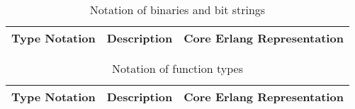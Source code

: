 \begin{table}[t]
  \centering
  \begin{tabularx}{\textwidth}{|c|>{\centering\arraybackslash}X|>{\centering\arraybackslash}X|}
    \hline
      Type Notation & Description & Core Erlang Representation \\
    \hline \hline
    \hline
  \end{tabularx}
  \caption{Notation of binaries and bit strings}
  \label{tab:notation_binary_types}
\end{table}

\begin{table}[t]
  \centering
  \begin{tabularx}{\textwidth}{|c|>{\centering\arraybackslash}X|>{\centering\arraybackslash}X|}
    \hline
      Type Notation & Description & Core Erlang Representation \\
    \hline \hline
    \hline
  \end{tabularx}
  \caption{Notation of function types}
  \label{tab:notation_funs}
\end{table}


